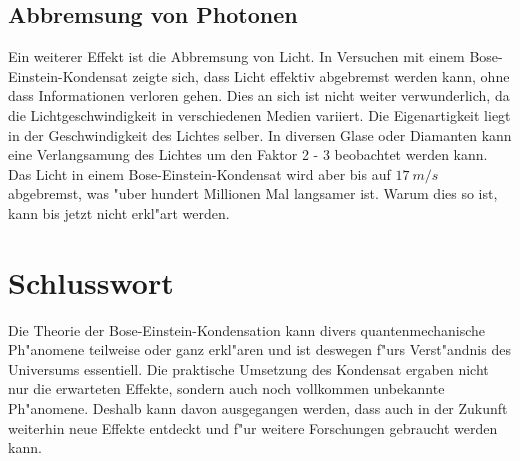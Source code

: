 \begin{refsection}
\subsection{Abbremsung von Photonen}

Ein weiterer Effekt ist die Abbremsung von Licht. In Versuchen mit einem Bose-Einstein-Kondensat zeigte sich, dass Licht effektiv abgebremst werden kann, ohne dass Informationen verloren gehen. Dies an sich ist nicht weiter verwunderlich, da die Lichtgeschwindigkeit in verschiedenen Medien variiert. Die Eigenartigkeit liegt in der Geschwindigkeit des Lichtes selber. In diversen Glase oder Diamanten kann eine Verlangsamung des Lichtes um den Faktor 2 - 3 beobachtet werden kann. Das Licht in einem Bose-Einstein-Kondensat wird aber bis auf $17~m/s$ abgebremst, was "uber hundert Millionen Mal langsamer ist. Warum dies so ist, kann bis jetzt nicht erkl"art werden. \cite{bose:SlowLight}

\section{Schlusswort}

Die Theorie der Bose-Einstein-Kondensation kann divers quantenmechanische Ph"anomene teilweise oder ganz erkl"aren und ist deswegen f"urs Verst"andnis des Universums essentiell. Die praktische Umsetzung des Kondensat ergaben nicht nur die erwarteten Effekte, sondern auch noch vollkommen unbekannte Ph"anomene. Deshalb kann davon ausgegangen werden, dass auch in der Zukunft weiterhin neue Effekte entdeckt und f"ur weitere Forschungen gebraucht werden kann. 

\printbibliography[heading=subbibliography]
\end{refsection}



